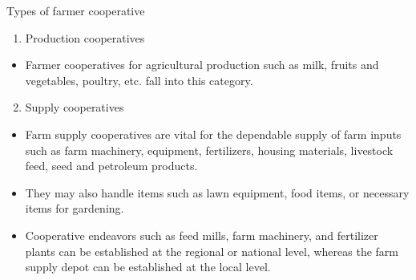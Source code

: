 \documentclass[12pt,ignorenonframetext,aspectratio=169]{beamer}
\providecommand{\tightlist}{%
  \setlength{\itemsep}{0pt}\setlength{\parskip}{0pt}}
\begin{document}
\begin{frame}{Types of farmer cooperative}
\protect\hypertarget{types-of-farmer-cooperative}{}
\footnotesize

\begin{enumerate}
\tightlist
\item
  Production cooperatives
\end{enumerate}

\begin{itemize}
\tightlist
\item
  Farmer cooperatives for agricultural production such as milk, fruits
  and vegetables, poultry, etc. fall into this category.
\end{itemize}

\begin{enumerate}
\setcounter{enumi}{1}
\tightlist
\item
  Supply cooperatives
\end{enumerate}

\begin{itemize}
\tightlist
\item
  Farm supply cooperatives are vital for the dependable supply of farm
  inputs such as farm machinery, equipment, fertilizers, housing
  materials, livestock feed, seed and petroleum products.
\item
  They may also handle items such as lawn equipment, food items, or
  necessary items for gardening.
\item
  Cooperative endeavors such as feed mills, farm machinery, and
  fertilizer plants can be established at the regional or national
  level, whereas the farm supply depot can be established at the local
  level.
\end{itemize}
\end{frame}
\end{document}
